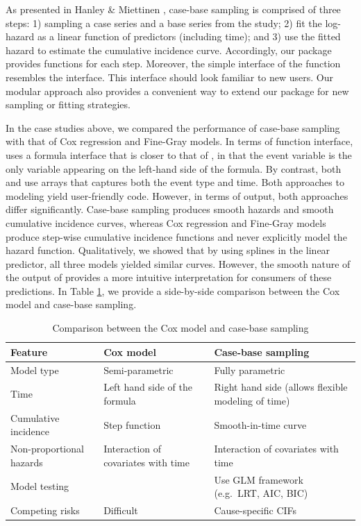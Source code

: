 \documentclass[
]{jss}
\begin{document}
As presented in Hanley \& Miettinen \citeyearpar{hanley2009fitting},
case-base sampling is comprised of three steps: 1) sampling a case
series and a base series from the study; 2) fit the log-hazard as a
linear function of predictors (including time); and 3) use the fitted
hazard to estimate the cumulative incidence curve. Accordingly, our
package provides functions for each step. Moreover, the simple interface
of the  function resembles the 
interface. This interface should look familiar to new users. Our modular
approach also provides a convenient way to extend our package for new
sampling or fitting strategies.

In the case studies above, we compared the performance of case-base
sampling with that of Cox regression and Fine-Gray models. In terms of
function interface,  uses a formula interface that is
closer to that of , in that the event variable is the only
variable appearing on the left-hand side of the formula. By contrast,
both  and  use arrays
that captures both the event type and time. Both approaches to modeling
yield user-friendly code. However, in terms of output, both approaches
differ significantly. Case-base sampling produces smooth hazards and
smooth cumulative incidence curves, whereas Cox regression and Fine-Gray
models produce step-wise cumulative incidence functions and never
explicitly model the hazard function. Qualitatively, we showed that by
using splines in the linear predictor, all three models yielded similar
curves. However, the smooth nature of the output of 
provides a more intuitive interpretation for consumers of these
predictions. In Table \ref{tab:compCBvsCox}, we provide a side-by-side
comparison between the Cox model and case-base sampling.

\begin{table}
\caption{\label{tab:compCBvsCox}Comparison between the Cox model and case-base sampling}
\centering
\begin{tabular}[t]{llp{5cm}}
\toprule
Feature & Cox model & Case-base sampling\\
\midrule
Model type & Semi-parametric & Fully parametric\\
Time & Left hand side of the formula & Right hand side (allows flexible modeling of time)\\
Cumulative incidence & Step function & Smooth-in-time curve\\
Non-proportional hazards & Interaction of covariates with time & Interaction of covariates with time\\
Model testing &  & Use GLM framework \newline (e.g.\ LRT, AIC, BIC)\\
\addlinespace
Competing risks & Difficult & Cause-specific CIFs\\
\bottomrule
\end{tabular}
\end{table}
\end{document}
